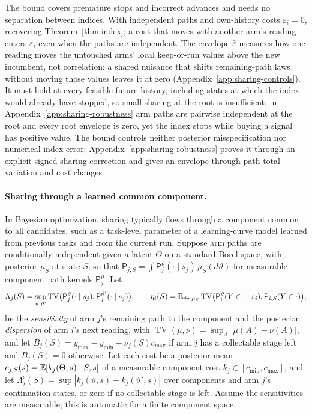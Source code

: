 The bound covers premature stops and incorrect advances and needs no separation between
indices. With independent paths and own-history costs $\varepsilon_i=0$, recovering
Theorem~\ref{thm:index}; a cost that moves with another arm's reading enters $\varepsilon_i$
even when the paths are independent. The
envelope $\bar\varepsilon$ measures how one reading moves the untouched arms' local
keep-or-run values above the new incumbent, not correlation: a shared nuisance that shifts
remaining-path laws without moving those values leaves it at zero
(Appendix~\ref{app:sharing-controls}). It must hold at every feasible future history,
including states at which the index would already have stopped, so small sharing at the root
is insufficient: in Appendix~\ref{app:sharing-robustness} arm paths are pairwise independent
at the root and every root envelope is zero, yet the index stops while buying a signal has
positive value. The bound controls neither posterior misspecification nor numerical index
error; Appendix~\ref{app:sharing-robustness} proves it through an explicit signed sharing
correction and gives an envelope through path total variation and cost changes.

\paragraph{Sharing through a learned common component.}
In Bayesian optimization, sharing typically flows through a component common to all
candidates, such as a task-level parameter of a learning-curve model learned from previous
tasks and from the current run. Suppose arm paths are conditionally independent given a latent
$\Theta$ on a standard Borel space, with posterior $\mu_S$ at state $S$, so that
$\mathsf P_{j,S}=\int\mathsf P_j^\vartheta(\cdot\mid s_j)\,\mu_S(d\vartheta)$ for
measurable component path kernels $\mathsf P_j^\vartheta$. Let
\[
 \Lambda_j(S)=\sup_{\vartheta,\vartheta'}\operatorname{TV}\bigl(\mathsf P_j^\vartheta(\cdot\mid s_j),\mathsf P_j^{\vartheta'}(\cdot\mid s_j)\bigr),\qquad
 \eta_i(S)=\mathbb{E}_{\vartheta\sim\mu_S}\operatorname{TV}\bigl(\mathsf P_i^\vartheta(Y\in\cdot\mid s_i),\mathsf P_{i,S}(Y\in\cdot)\bigr),
\]
be the \emph{sensitivity} of arm $j$'s remaining path to the component and the posterior
\emph{dispersion} of arm $i$'s next reading, with
$\operatorname{TV}(\mu,\nu)=\sup_A|\mu(A)-\nu(A)|$, and let
$B_j(S)=y_{\max}-y_{\min}+\nu_j(S)c_{\max}$ if arm $j$ has a collectable stage left and
$B_j(S)=0$ otherwise. Let each cost be a posterior mean
$c_{j,S}(s)=\mathbb{E}[k_j(\Theta,s)\mid S,s]$ of a measurable component cost
$k_j\in[c_{\min},c_{\max}]$, and let $\Lambda^c_j(S)=\sup|k_j(\vartheta,s)-k_j(\vartheta',s)|$
over components and arm $j$'s continuation states, or zero if no collectable stage is left.
Assume the sensitivities are measurable;
this is automatic for a finite component space.

